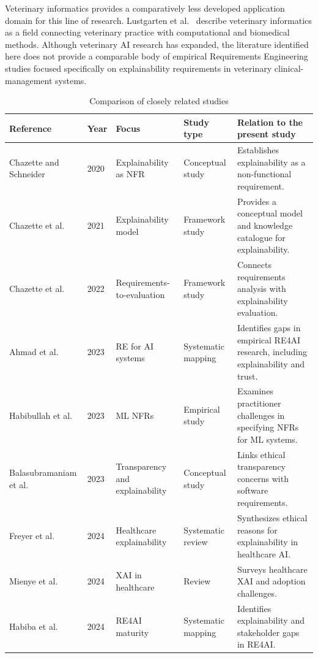 \documentclass[pdflatex,sn-mathphys-num,Numbered]{sn-jnl}
\begin{document}
Veterinary informatics provides a comparatively less developed application domain for this line of research. Lustgarten et al.~\cite{lustgarten2020} describe veterinary informatics as a field connecting veterinary practice with computational and biomedical methods. Although veterinary AI research has expanded, the literature identified here does not provide a comparable body of empirical Requirements Engineering studies focused specifically on explainability requirements in veterinary clinical-management systems.

\begin{table}[tp]
\caption{Comparison of closely related studies}
\label{tab1}
\centering
\tiny
\setlength{\tabcolsep}{1.5pt}
\renewcommand{\arraystretch}{0.85}
\begin{tabular}{@{}p{2.4cm}p{0.7cm}p{2.0cm}p{2.0cm}p{3.2cm}@{}}
\toprule
Reference & Year & Focus & Study type & Relation to the present study \\
\midrule
Chazette and Schneider~\cite{chazette2020} & 2020 & Explainability as NFR & Conceptual study & Establishes explainability as a non-functional requirement. \\
Chazette et al.~\cite{chazette2021} & 2021 & Explainability model & Framework study & Provides a conceptual model and knowledge catalogue for explainability. \\
Chazette et al.~\cite{chazette2022} & 2022 & Requirements-to-evaluation & Framework study & Connects requirements analysis with explainability evaluation. \\
Ahmad et al.~\cite{ahmad2023} & 2023 & RE for AI systems & Systematic mapping & Identifies gaps in empirical RE4AI research, including explainability and trust. \\
Habibullah et al.~\cite{habibullah2023} & 2023 & ML NFRs & Empirical study & Examines practitioner challenges in specifying NFRs for ML systems. \\
Balasubramaniam et al.~\cite{balasubramaniam2023} & 2023 & Transparency and explainability & Conceptual study & Links ethical transparency concerns with software requirements. \\
Freyer et al.~\cite{freyer2024} & 2024 & Healthcare explainability & Systematic review & Synthesizes ethical reasons for explainability in healthcare AI. \\
Mienye et al.~\cite{mienye2024} & 2024 & XAI in healthcare & Review & Surveys healthcare XAI and adoption challenges. \\
Habiba et al.~\cite{habiba2024} & 2024 & RE4AI maturity & Systematic mapping & Identifies explainability and stakeholder gaps in RE4AI. \\

\end{tabular}
\end{table}
\end{document}

